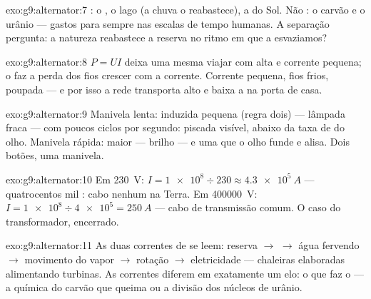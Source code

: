 \begin{solution}{exo:g9:alternator:7}
: o , o lago (a chuva o reabastece), a  do Sol. Não
: o carvão e o urânio --- gastos para sempre nas escalas de
tempo humanas. A separação pergunta: a natureza reabastece a reserva
no ritmo em que a esvaziamos?
\end{solution}

\begin{solution}{exo:g9:alternator:8}
$P = U I$ deixa uma mesma  viajar com  alta e corrente
pequena; o  faz a perda dos fios crescer com a
corrente. Corrente pequena, fios frios,  poupada --- e por
isso a rede transporta alto e baixa a  na porta de casa.
\end{solution}

\begin{solution}{exo:g9:alternator:9}
Manivela lenta:  induzida pequena (regra dois) --- lâmpada
fraca --- com poucos ciclos por segundo: piscada visível, abaixo da
taxa de  do olho. Manivela rápida:  maior --- brilho ---
e uma  que o olho funde e alisa. Dois botões, uma manivela.
\end{solution}

\begin{solution}{exo:g9:alternator:10}
Em \qty{230}{V}: $I = \num{1e8} \div 230 \approx \qty{4.3e5}{A}$ ---
quatrocentos mil : cabo nenhum na Terra. Em \qty{400000}{V}:
$I = \num{1e8} \div \num{4e5} = \qty{250}{A}$ --- cabo de transmissão
comum. O caso do transformador, encerrado.
\end{solution}

\begin{solution}{exo:g9:alternator:11}
As duas correntes de  se leem: reserva $\to$  $\to$ água
fervendo $\to$ movimento do vapor $\to$ rotação $\to$ eletricidade ---
chaleiras elaboradas alimentando turbinas. As correntes diferem em
exatamente um elo: o que faz o  --- a química do carvão que
queima ou a divisão dos núcleos de urânio.
\end{solution}


